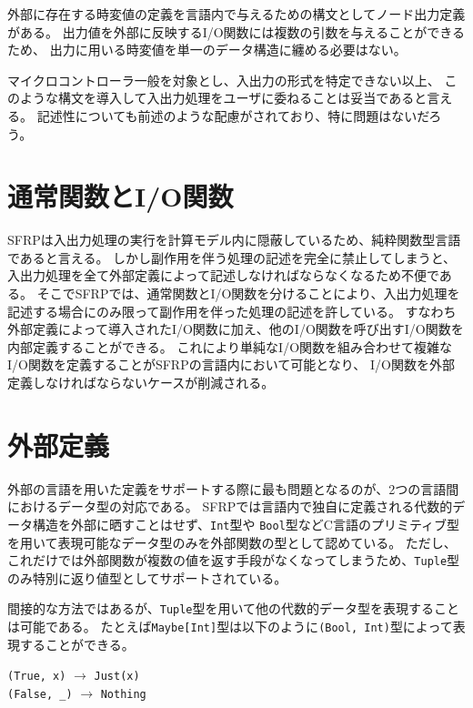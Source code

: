 外部に存在する時変値の定義を言語内で与えるための構文としてノード出力定義がある。
出力値を外部に反映するI/O関数には複数の引数を与えることができるため、
出力に用いる時変値を単一のデータ構造に纏める必要はない。

マイクロコントローラ一般を対象とし、入出力の形式を特定できない以上、
このような構文を導入して入出力処理をユーザに委ねることは妥当であると言える。
記述性についても前述のような配慮がされており、特に問題はないだろう。

\section{通常関数とI/O関数}
SFRPは入出力処理の実行を計算モデル内に隠蔽しているため、純粋関数型言語であると言える。
しかし副作用を伴う処理の記述を完全に禁止してしまうと、入出力処理を全て外部定義によって記述しなければならなくなるため不便である。
そこでSFRPでは、通常関数とI/O関数を分けることにより、入出力処理を記述する場合にのみ限って副作用を伴った処理の記述を許している。
すなわち外部定義によって導入されたI/O関数に加え、他のI/O関数を呼び出すI/O関数を内部定義することができる。
これにより単純なI/O関数を組み合わせて複雑なI/O関数を定義することがSFRPの言語内において可能となり、
I/O関数を外部定義しなければならないケースが削減される。

\section{外部定義}
外部の言語を用いた定義をサポートする際に最も問題となるのが、2つの言語間におけるデータ型の対応である。
SFRPでは言語内で独自に定義される代数的データ構造を外部に晒すことはせず、\texttt{Int}型や
\texttt{Bool}型などC言語のプリミティブ型を用いて表現可能なデータ型のみを外部関数の型として認めている。
ただし、これだけでは外部関数が複数の値を返す手段がなくなってしまうため、\texttt{Tuple}型のみ特別に返り値型としてサポートされている。

間接的な方法ではあるが、\texttt{Tuple}型を用いて他の代数的データ型を表現することは可能である。
たとえば\texttt{Maybe[Int]}型は以下のように\texttt{(Bool, Int)}型によって表現することができる。
\begin{center}
  \texttt{(True, x)} $\rightarrow$ \texttt{Just(x)}\\ \texttt{(False, \_)} $\rightarrow$ \texttt{Nothing}
\end{center}
